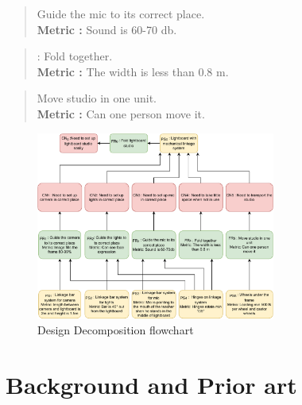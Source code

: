 \documentclass[a4paper]{jpconf}
\begin{document}
	\begin{quote} 
		\textbf{} Guide the mic  to its correct place.
		\\ \textbf{Metric :} Sound is 60-70 db\cite{db}.
	\end{quote}
	
	\begin{quote} 
		\textbf{} :  Fold together.
		\\ \textbf{Metric :} The width is less than 0.8 m.
	\end{quote}
	
	\begin{quote} 
		\textbf{} Move studio in one unit.
		\\ \textbf{Metric :} Can one person move it.
	\end{quote}
	
	
	\begin{figure}[]
		\centering
		\includegraphics [width=0.7\textwidth]{matrix.pdf}
		\caption{Design Decomposition flowchart}
		\label{fig:matrix}
	\end{figure}
	
	
	
	
	\section{Background and Prior art}
	
\end{document}

